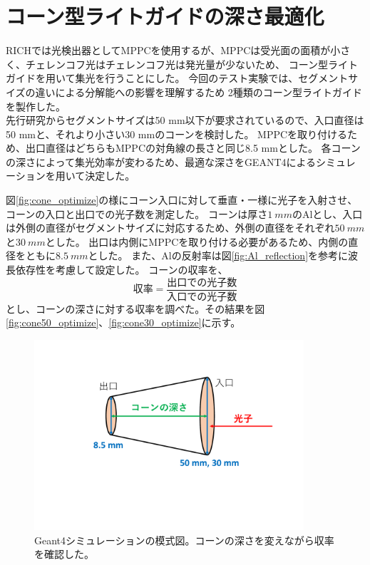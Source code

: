 \section{コーン型ライトガイドの深さ最適化}
RICHでは光検出器としてMPPCを使用するが、MPPCは受光面の面積が小さく、チェレンコフ光はチェレンコフ光は発光量が少ないため、
コーン型ライトガイドを用いて集光を行うことにした。
今回のテスト実験では、セグメントサイズの違いによる分解能への影響を理解するため
2種類のコーン型ライトガイドを製作した。\\
先行研究からセグメントサイズは50 mm以下が要求されているので、入口直径は50 mmと、それより小さい30 mmのコーンを検討した。
MPPCを取り付けるため、出口直径はどちらもMPPCの対角線の長さと同じ8.5 mmとした。
各コーンの深さによって集光効率が変わるため、最適な深さをGEANT4によるシミュレーションを用いて決定した。\\\indent

図\ref{fig:cone_optimize}の様にコーン入口に対して垂直・一様に光子を入射させ、コーンの入口と出口での光子数を測定した。
コーンは厚さ$\SI{1}{mm}$のAlとし、入口は外側の直径がセグメントサイズに対応するため、外側の直径をそれぞれ$\SI{50}{mm}$と$\SI{30}{mm}$とした。
出口は内側にMPPCを取り付ける必要があるため、内側の直径をともに$\SI{8.5}{mm}$とした。
また、Alの反射率は図\ref{fig:Al_reflection}を参考に波長依存性を考慮して設定した。
コーンの収率を、
\begin{equation}
  \label{eq:cone_yield}
  \mbox{収率} = \frac{\mbox{出口での光子数}}{\mbox{入口での光子数}}
\end{equation}
とし、コーンの深さに対する収率を調べた。その結果を図\ref{fig:cone50_optimize}、\ref{fig:cone30_optimize}に示す。
\begin{figure}
  \centering
  \includegraphics[width=10cm]{images/chapter3/cone_optimize.pdf}
  \caption{Geant4シミュレーションの模式図。コーンの深さを変えながら収率を確認した。}
  \label{fig:cone_optimize_image}
\end{figure}

